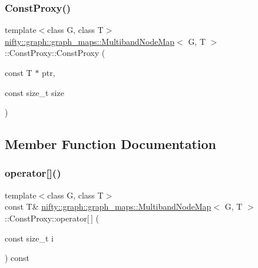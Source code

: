 \subsubsection{\texorpdfstring{Const\+Proxy()}{ConstProxy()}}
{\footnotesize\ttfamily template$<$class G, class T$>$ \\
\hyperlink{structnifty_1_1graph_1_1graph__maps_1_1MultibandNodeMap}{nifty\+::graph\+::graph\+\_\+maps\+::\+Multiband\+Node\+Map}$<$ G, T $>$\+::Const\+Proxy\+::\+Const\+Proxy (\begin{DoxyParamCaption}\item[{const T $\ast$}]{ptr,  }\item[{const size\+\_\+t}]{size }\end{DoxyParamCaption})\hspace{0.3cm}{\ttfamily [inline]}}



\subsection{Member Function Documentation}
\mbox{\label{classnifty_1_1graph_1_1graph__maps_1_1MultibandNodeMap_1_1ConstProxy_ac3afeffc19404871dc6b86a077717d84}} 
\subsubsection{\texorpdfstring{operator[]()}{operator[]()}\hspace{0.1cm}{\footnotesize\ttfamily [1/2]}}
{\footnotesize\ttfamily template$<$class G, class T$>$ \\
const T\& \hyperlink{structnifty_1_1graph_1_1graph__maps_1_1MultibandNodeMap}{nifty\+::graph\+::graph\+\_\+maps\+::\+Multiband\+Node\+Map}$<$ G, T $>$\+::Const\+Proxy\+::operator\mbox{[}$\,$\mbox{]} (\begin{DoxyParamCaption}\item[{const size\+\_\+t}]{i }\end{DoxyParamCaption}) const\hspace{0.3cm}{\ttfamily [inline]}}

